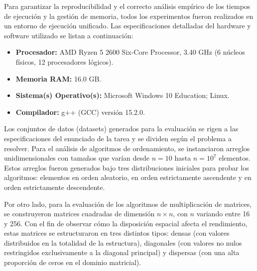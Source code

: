 Para garantizar la reproducibilidad y el correcto análisis empírico de los tiempos de ejecución y la gestión de memoria, todos los experimentos fueron realizados en un entorno de ejecución unificado. Las especificaciones detalladas del hardware y software utilizado se listan a continuación:

\begin{itemize}
    \item \textbf{Procesador:} AMD Ryzen 5 2600 Six-Core Processor, 3.40 GHz (6 núcleos físicos, 12 procesadores lógicos).
    \item \textbf{Memoria RAM:} 16.0 GB.
    \item \textbf{Sistema(s) Operativo(s):} Microsoft Windows 10 Education; Linux.
    \item \textbf{Compilador:} g++ (GCC) versión 15.2.0.
\end{itemize}

Los conjuntos de datos (datasets) generados para la evaluación se rigen a las especificaciones del enunciado de la tarea y se dividen según el problema a resolver. Para el análisis de algoritmos de ordenamiento, se instanciaron arreglos unidimensionales con tamaños que varían desde $n=10$ hasta $n=10^7$ elementos. Estos arreglos fueron generados bajo tres distribuciones iniciales para probar los algoritmos: elementos en orden aleatorio, en orden estrictamente ascendente y en orden estrictamente descendente.

Por otro lado, para la evaluación de los algoritmos de multiplicación de matrices, se construyeron matrices cuadradas de dimensión $n \times n$, con $n$ variando entre 16 y 256. Con el fin de observar cómo la disposición espacial afecta el rendimiento, estas matrices se estructuraron en tres distintos tipos: densas (con valores distribuidos en la totalidad de la estructura), diagonales (con valores no nulos restringidos exclusivamente a la diagonal principal) y dispersas (con una alta proporción de ceros en el dominio matricial).